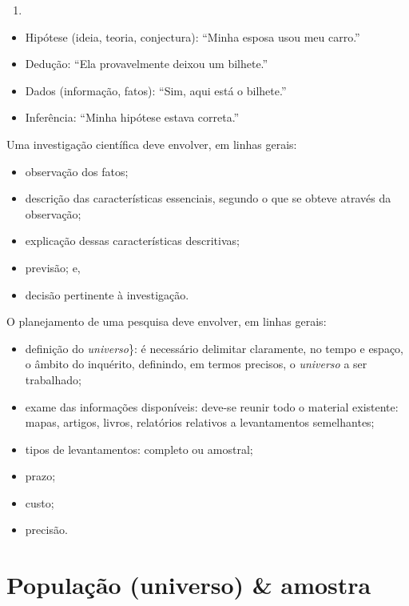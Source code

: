 \documentclass[
]{book}
\providecommand{\tightlist}{%
  \setlength{\itemsep}{0pt}\setlength{\parskip}{0pt}}
\begin{document}
\begin{enumerate}
\def\labelenumi{(\Alph{enumi})}
\setcounter{enumi}{3}
\tightlist
\item
\end{enumerate}

\begin{itemize}
\tightlist
\item
  Hipótese (ideia, teoria, conjectura): ``Minha esposa usou meu carro.''
\item
  Dedução: ``Ela provavelmente deixou um bilhete.''
\item
  Dados (informação, fatos): ``Sim, aqui está o bilhete.''
\item
  Inferência: ``Minha hipótese estava correta.''
\end{itemize}

Uma investigação científica deve envolver, em linhas gerais:

\begin{itemize}
\tightlist
\item
  observação dos fatos;
\item
  descrição das características essenciais, segundo o que se obteve através da observação;
\item
  explicação dessas características descritivas;
\item
  previsão; e,
\item
  decisão pertinente à investigação.
\end{itemize}

O planejamento de uma pesquisa deve envolver, em linhas gerais:

\begin{itemize}
\tightlist
\item
  definição do \emph{universo}\}: é necessário delimitar claramente, no tempo e espaço, o âmbito do inquérito, definindo, em termos precisos, o \emph{universo} a ser trabalhado;
\item
  exame das informações disponíveis: deve-se reunir todo o material existente: mapas, artigos, livros, relatórios relativos a levantamentos semelhantes;
\item
  tipos de levantamentos: completo ou amostral;
\item
  prazo;
\item
  custo;
\item
  precisão.
\end{itemize}

\hypertarget{populauxe7uxe3o-universo-amostra}{%
\section{População (universo) \& amostra}\label{populauxe7uxe3o-universo-amostra}}
\end{document}

